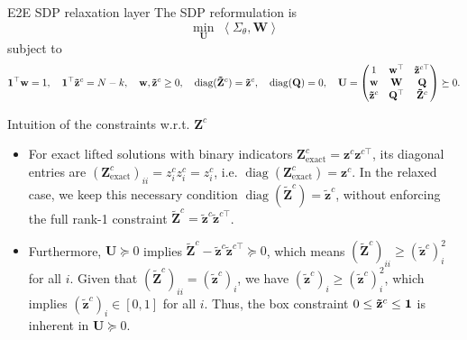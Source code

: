 \documentclass[10pt,aspectratio=169]{beamer}
\newcommand{\Nassets}{N}
\newcommand{\Kcard}{k}
\newcommand{\Param}{\theta}
\newcommand{\SigmaMat}{\Sigma}
\newcommand{\diagv}{\operatorname{diag}}
\begin{document}
\begin{frame}{E2E SDP relaxation layer}
   \footnotesize
  The SDP reformulation is
  \[
    \min_\mathbf{U} \; \left\langle \SigmaMat_\Param, \mathbf{W} \right\rangle
  \]
  subject to
  \[
  \begin{aligned}
    \one^\top \mathbf{w} =1,\quad \one^\top \mathbf{\tilde z}^c=\Nassets-\Kcard, \quad \mathbf{w}, \mathbf{\tilde z}^c \ge 0, \quad 
    \diagv(\mathbf{\tilde Z}^c) =\mathbf{\tilde z}^c, 
    \quad
    \diagv(\mathbf{Q})=0,\quad
    \mathbf{U}  =
    \begin{pmatrix}
      1 & \mathbf{w}^\top & \mathbf{\tilde z}^{c\top}\\
      \mathbf{w} & \mathbf{W} & \mathbf{Q}\\
      \mathbf{\tilde z}^c & \mathbf{Q}^\top & \mathbf{\tilde Z}^c
    \end{pmatrix}   \succeq 0.
  \end{aligned}
  \]

  \begin{block}{\small Intuition of the constraints w.r.t. $\mathbf{Z}^c$ }
    \footnotesize
    \begin{itemize}
      \item For exact lifted solutions with binary indicators $\mathbf{Z}_{\text{exact}}^c = \mathbf{z}^c \mathbf{z}^{c\top}$, its diagonal entries are $(\mathbf{Z}_{\text{exact}}^c)_{ii} = z_i^c z_i^c = z_i^c$, i.e. $\diagv(\mathbf{Z}_{\text{exact}}^c) = \mathbf{z}^c$.  In the relaxed case, we keep this necessary condition $\diagv(\mathbf{\tilde Z}^c) = \mathbf{\tilde z}^c$, without enforcing the full rank-1 constraint $\mathbf{\tilde Z}^c = \mathbf{\tilde z}^c \mathbf{\tilde z}^{c\top}$. 
      \item Furthermore, $\mathbf{U} \succeq 0$ implies $\mathbf{\tilde Z}^c - \mathbf{\tilde z}^c \mathbf{\tilde z}^{c\top} \succeq 0$, which means $(\mathbf{\tilde Z}^c)_{ii} \ge (\mathbf{\tilde z}^c)_i^2$ for all $i$. Given that $(\mathbf{\tilde Z}^c)_{ii} = (\mathbf{\tilde z}^c)_i$, we have $(\mathbf{\tilde z}^c)_i \ge (\mathbf{\tilde z}^c)_i^2$, which implies $(\mathbf{\tilde z}^c)_i \in [0,1]$ for all $i$. Thus, the box constraint $0 \le \mathbf{\tilde z}^c \le \mathbf{1}$ is inherent in $\mathbf{U} \succeq 0$.
    \end{itemize}
  \end{block}

\end{frame}
\end{document}
